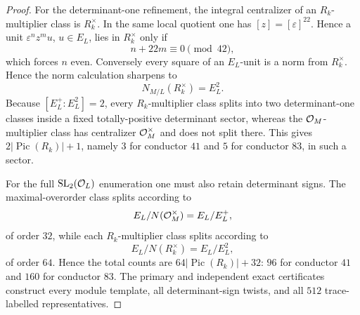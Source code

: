 \begin{proof}
For the determinant-one refinement, the integral centralizer of an $R_k$-multiplier class is $R_k^\times$.  In the same local quotient one has $[z]=[\varepsilon]^{22}$.  Hence a unit $\varepsilon^n z^m u$, $u\in E_L$, lies in $R_k^\times$ only if
\[
 n+22m\equiv0\pmod{42},
\]
which forces $n$ even.  Conversely every square of an $E_L$-unit is a norm
from $R_k^\times$.  Hence the norm calculation sharpens to
\[
 N_{M/L}(R_k^\times)=E_L^2.
\]
Because $[E_L^+:E_L^2]=2$, every $R_k$-multiplier class splits into two determinant-one classes inside a fixed totally-positive determinant sector, whereas the $\mathcal O_M$-multiplier class has centralizer $\mathcal O_M^\times$ and does not split there.  This gives $2|\operatorname{Pic}(R_k)|+1$, namely $3$ for conductor $41$ and $5$ for conductor $83$, in such a sector.

For the full $\mathrm{SL}_2(\mathcal O_L)$ enumeration one must also retain determinant signs.  The maximal-overorder class splits according to
\[
 E_L/N(\mathcal O_M^\times)=E_L/E_L^+,
\]
of order $32$, while each $R_k$-multiplier class splits according to
\[
 E_L/N(R_k^\times)=E_L/E_L^2,
\]
of order $64$.  Hence the total counts are $64|\operatorname{Pic}(R_k)|+32$: $96$ for conductor $41$ and $160$ for conductor $83$.  The primary and independent exact certificates construct every module template, all determinant-sign twists, and all $512$ trace-labelled representatives.
\end{proof}

